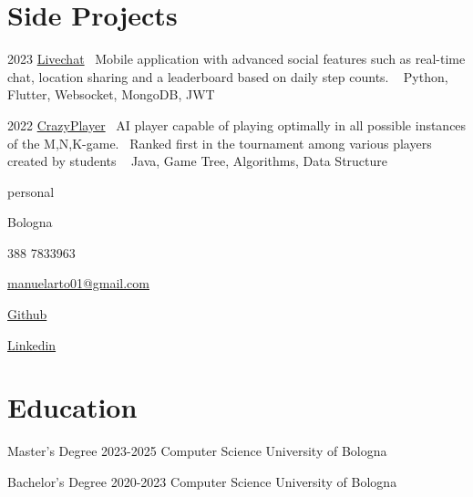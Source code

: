 \documentclass{tccv}
\begin{document}
\section{Side Projects}

\begin{yearlist}

\item{2023}
     {\href{https://github.com/manuelarto/livechat}{Livechat}}
     {\textbullet~Mobile application with advanced social features such as real-time chat, location sharing and a leaderboard based on daily step counts. \newline
    \textbullet~ Python, Flutter, Websocket, MongoDB, JWT}
\item{2022}
     {\href{https://github.com/manuelarto/crazyplayer}{CrazyPlayer}}
     {\textbullet~AI player capable of playing optimally in all possible instances of the M,N,K-game. \newline
     \textbullet~Ranked first in the tournament among various players created by students \newline
    \textbullet~ Java, Game Tree, Algorithms, Data Structure}

\end{yearlist}


\newpage


\begin{keyvaluelist}{personal}
    \item[\faHome] Bologna
    \item[\faPhone] 388 7833963
    \item[\faEnvelope] \href{mailto:my@email.address}{manuelarto01@gmail.com}
    \item[\faGithub] \href{https://github.com/manuelarto}{Github}
    \item[\faLinkedin] \href{https://www.linkedin.com/in/manuel-arto-696012203/}{Linkedin}
\end{keyvaluelist}


\section{Education}

\begin{yearlist}

\item[Master's Degree]{2023-2025}
     {Computer Science}
     {University of Bologna}

\item[Bachelor's Degree]{2020-2023}
    {Computer Science}
    {University of Bologna}

\end{yearlist}
\end{document}
